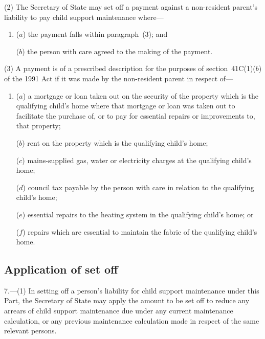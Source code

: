 \documentclass[12pt,a4paper]{article}
\begin{document}
(2) The 
Secretary of State  %
may set off a payment against a non-resident parent’s liability to pay child support maintenance where—
\begin{enumerate}\item[]
($a$) the payment falls within paragraph~(3); and

($b$) the person with care agreed to the making of the payment.
\end{enumerate}

(3) A payment is of a prescribed description for the purposes of section~41C(1)($b$)  of the 1991 Act if it was made by the non-resident parent in respect of—
\begin{enumerate}\item[]
($a$) a mortgage or loan taken out on the security of the property which is the qualifying child’s home where that mortgage or loan was taken out to facilitate the purchase of, or to pay for essential repairs or improvements to, that property;

($b$) rent on the property which is the qualifying child’s home;

($c$) mains-supplied gas, water or electricity charges at the qualifying child’s home;

($d$) council tax payable by the person with care in relation to the qualifying child’s home;

($e$) essential repairs to the heating system in the qualifying child’s home; or

($f$) repairs which are essential to maintain the fabric of the qualifying child’s home.
\end{enumerate}


\subsection[7. Application of set off]{Application of set off}

7.---(1)  In setting off a person’s liability for child support maintenance under this Part, the 
Secretary of State  %
may apply the amount to be set off to reduce any arrears of child support maintenance due under any current maintenance calculation, or any previous maintenance calculation made in respect of the same relevant persons.
\end{document}
